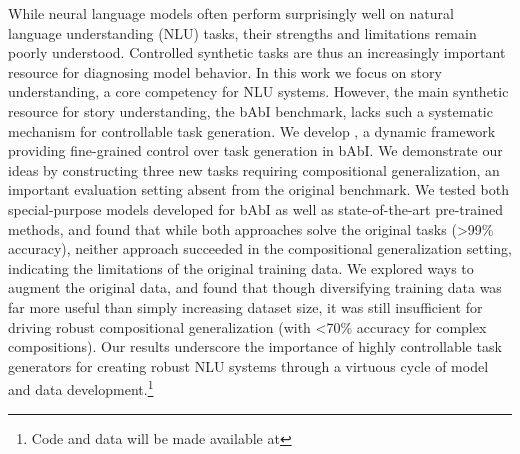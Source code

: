 

While neural language models often perform surprisingly well on natural language understanding (NLU) tasks, their strengths and limitations remain poorly understood. Controlled synthetic tasks are thus an increasingly important resource for diagnosing model behavior. In this work we focus on story understanding, a core competency for NLU systems. However, the main synthetic resource for story understanding, the bAbI benchmark, lacks such a systematic mechanism for controllable task generation. We develop \pybabi, a dynamic framework providing fine-grained control over task generation in bAbI. We demonstrate our ideas by constructing three new tasks requiring compositional generalization, an important evaluation setting absent from the original benchmark. We tested both special-purpose models developed for bAbI as well as state-of-the-art pre-trained methods, and found that while both approaches solve the original tasks (>99\% accuracy), neither approach succeeded in the compositional generalization setting, indicating the limitations of the original training data.
We explored ways to augment the original data, and found that though diversifying training data was far more useful than simply increasing dataset size, it was still insufficient for driving robust compositional generalization (with <70\% accuracy for complex compositions). Our results underscore the importance of highly controllable task generators for creating robust NLU systems through a virtuous cycle of model and data development.\footnote{Code and data will be made available at \pybabiurl}


























